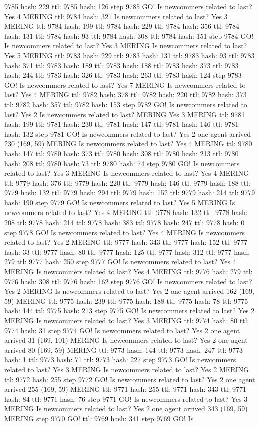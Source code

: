 9785 hash: 229 ttl: 9785 hash: 126 step 9785 GO! Is newcommers related to last? Yes 4 MERING ttl: 9784 hash: 321 Is newcommers related to last? Yes 3 MERING ttl: 9784 hash: 199 ttl: 9784 hash: 229 ttl: 9784 hash: 356 ttl: 9784 hash: 131 ttl: 9784 hash: 93 ttl: 9784 hash: 308 ttl: 9784 hash: 151 step 9784 GO! Is newcommers related to last? Yes 3 MERING Is newcommers related to last? Yes 5 MERING ttl: 9783 hash: 229 ttl: 9783 hash: 131 ttl: 9783 hash: 93 ttl: 9783 hash: 371 ttl: 9783 hash: 189 ttl: 9783 hash: 188 ttl: 9783 hash: 373 ttl: 9783 hash: 244 ttl: 9783 hash: 326 ttl: 9783 hash: 263 ttl: 9783 hash: 124 step 9783 GO! Is newcommers related to last? Yes 7 MERING Is newcommers related to last? Yes 4 MERING ttl: 9782 hash: 378 ttl: 9782 hash: 220 ttl: 9782 hash: 373 ttl: 9782 hash: 357 ttl: 9782 hash: 153 step 9782 GO! Is newcommers related to last? Yes 2 Is newcommers related to last? MERING Yes 3 MERING ttl: 9781 hash: 199 ttl: 9781 hash: 230 ttl: 9781 hash: 147 ttl: 9781 hash: 146 ttl: 9781 hash: 132 step 9781 GO! Is newcommers related to last? Yes 2 one agent arrived 230 (169, 59) MERING Is newcommers related to last? Yes 4 MERING ttl: 9780 hash: 147 ttl: 9780 hash: 373 ttl: 9780 hash: 308 ttl: 9780 hash: 213 ttl: 9780 hash: 208 ttl: 9780 hash: 73 ttl: 9780 hash: 74 step 9780 GO! Is newcommers related to last? Yes 3 MERING Is newcommers related to last? Yes 4 MERING ttl: 9779 hash: 376 ttl: 9779 hash: 220 ttl: 9779 hash: 146 ttl: 9779 hash: 188 ttl: 9779 hash: 132 ttl: 9779 hash: 294 ttl: 9779 hash: 152 ttl: 9779 hash: 214 ttl: 9779 hash: 190 step 9779 GO! Is newcommers related to last? Yes 5 MERING Is newcommers related to last? Yes 4 MERING ttl: 9778 hash: 132 ttl: 9778 hash: 208 ttl: 9778 hash: 214 ttl: 9778 hash: 383 ttl: 9778 hash: 247 ttl: 9778 hash: 0 step 9778 GO! Is newcommers related to last? Yes 4 MERING Is newcommers related to last? Yes 2 MERING ttl: 9777 hash: 343 ttl: 9777 hash: 152 ttl: 9777 hash: 33 ttl: 9777 hash: 80 ttl: 9777 hash: 125 ttl: 9777 hash: 312 ttl: 9777 hash: 279 ttl: 9777 hash: 250 step 9777 GO! Is newcommers related to last? Yes 4 MERING Is newcommers related to last? Yes 4 MERING ttl: 9776 hash: 279 ttl: 9776 hash: 308 ttl: 9776 hash: 162 step 9776 GO! Is newcommers related to last? Yes 2 MERING Is newcommers related to last? Yes 2 one agent arrived 162 (169, 59) MERING ttl: 9775 hash: 239 ttl: 9775 hash: 188 ttl: 9775 hash: 78 ttl: 9775 hash: 144 ttl: 9775 hash: 213 step 9775 GO! Is newcommers related to last? Yes 2 MERING Is newcommers related to last? Yes 3 MERING ttl: 9774 hash: 80 ttl: 9774 hash: 31 step 9774 GO! Is newcommers related to last? Yes 2 one agent arrived 31 (169, 101) MERING Is newcommers related to last? Yes 2 one agent arrived 80 (169, 59) MERING ttl: 9773 hash: 144 ttl: 9773 hash: 247 ttl: 9773 hash: 1 ttl: 9773 hash: 71 ttl: 9773 hash: 227 step 9773 GO! Is newcommers related to last? Yes 3 MERING Is newcommers related to last? Yes 2 MERING ttl: 9772 hash: 255 step 9772 GO! Is newcommers related to last? Yes 2 one agent arrived 255 (169, 59) MERING ttl: 9771 hash: 255 ttl: 9771 hash: 343 ttl: 9771 hash: 84 ttl: 9771 hash: 76 step 9771 GO! Is newcommers related to last? Yes 3 MERING Is newcommers related to last? Yes 2 one agent arrived 343 (169, 59) MERING step 9770 GO! ttl: 9769 hash: 341 step 9769 GO! Is 